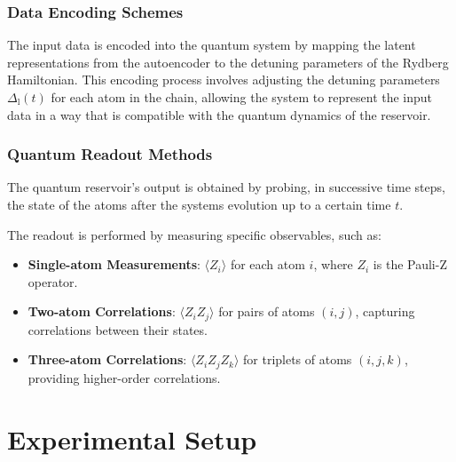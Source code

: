 \documentclass[conference]{IEEEtran}
\begin{document}
\subsubsection{Data Encoding Schemes}
The input data is encoded into the quantum system by mapping
the latent representations from the autoencoder to the
detuning parameters of the Rydberg Hamiltonian.
This encoding process involves adjusting the detuning
parameters \( \Delta_{\mathrm{l}}(t) \) for each atom in the chain,
allowing the system to represent the input data in a way that
is compatible with the quantum dynamics of the reservoir.

\subsubsection{Quantum Readout Methods}
The quantum reservoir's output is obtained by probing, 
in successive time steps, the state of the atoms 
after the systems evolution up to a certain time \( t \).

The readout is performed by measuring specific observables,
such as:
\begin{itemize}
    \item \textbf{Single-atom Measurements}: 
    \( \langle Z_i \rangle \) for each atom \( i \), where \( Z_i \) is the Pauli-Z operator.
    \item \textbf{Two-atom Correlations}: 
    \( \langle Z_i Z_j \rangle \) for pairs of atoms \( (i, j) \), capturing correlations between their states.
    \item \textbf{Three-atom Correlations}:
    \( \langle Z_i Z_j Z_k \rangle \) for triplets of atoms \( (i, j, k) \), providing higher-order correlations.
\end{itemize}

\section{Experimental Setup}
\end{document}
